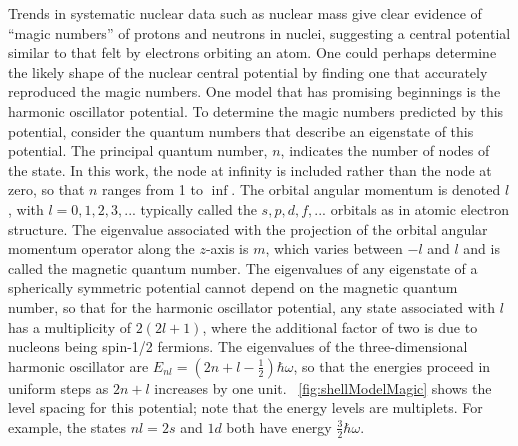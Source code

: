 Trends in systematic nuclear data such as nuclear mass give clear evidence of ``magic numbers'' of protons and neutrons in nuclei, suggesting a central potential similar to that felt by electrons orbiting an atom.  One could perhaps determine the likely shape of the nuclear central potential by finding one that accurately reproduced the magic numbers.  One model that has promising beginnings is the harmonic oscillator potential.  To determine the magic numbers predicted by this potential, consider the quantum numbers that describe an eigenstate of this potential.  The principal quantum number, $n$, indicates the number of nodes of the state.  In this work, the node at infinity is included rather than the node at zero, so that $n$ ranges from 1 to $\inf$.  The orbital angular momentum is denoted $l$, with $l = 0, 1, 2, 3, ...$ typically called the $s, p, d, f, ...$ orbitals as in atomic electron structure.  The eigenvalue associated with the projection of the orbital angular momentum operator along the $z$-axis is $m$, which varies between $-l$ and $l$ and is called the magnetic quantum number.  The eigenvalues of any eigenstate of a spherically symmetric potential cannot depend on the magnetic quantum number, so that for the harmonic oscillator potential, any state associated with $l$ has a multiplicity of $2(2l+1)$, where the additional factor of two is due to nucleons being spin-1/2 fermions.  The eigenvalues of the three-dimensional harmonic oscillator are $E_{nl} = (2n+l-\frac{1}{2})\hbar\omega$, so that the energies proceed in uniform steps as $2n+l$ increases by one unit.  {\fig}~\ref{fig:shellModelMagic} shows the level spacing for this potential; note that the energy levels are multiplets.  For example, the states $nl = 2s$ and $1d$ both have energy $\frac{3}{2}\hbar\omega$.  
